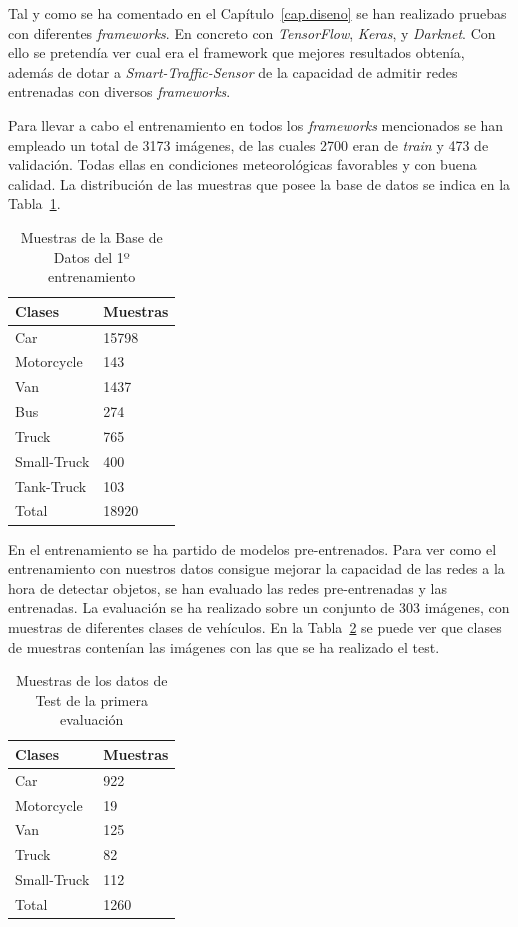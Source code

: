 Tal y como se ha comentado en el Capítulo~\ref{cap.diseno} se han realizado pruebas con diferentes \textit{frameworks}. En concreto con \textit{TensorFlow}, \textit{Keras}, y \textit{Darknet}. Con ello se pretendía ver cual era el framework que mejores resultados obtenía, además de dotar a \textit{Smart-Traffic-Sensor} de la capacidad de admitir redes entrenadas con diversos \textit{frameworks}.

Para llevar a cabo el entrenamiento en todos los \textit{frameworks} mencionados se han empleado un total de 3173 imágenes, de las cuales 2700 eran de \textit{train} y 473 de validación. Todas ellas en condiciones meteorológicas favorables y con buena calidad. La distribución de las muestras que posee la base de datos se indica en la Tabla~\ref{tabla_database}.

\begin{table}[H]
\begin{center}
\begin{tabular}{|l|l|}
\hline
Clases & Muestras \\
\hline \hline
Car & 15798 \\ \hline
Motorcycle & 143 \\ \hline
Van & 1437 \\ \hline
Bus & 274 \\ \hline
Truck & 765 \\ \hline
Small-Truck & 400 \\ \hline
Tank-Truck & 103 \\ \hline
Total & 18920 \\ \hline
\end{tabular}
\caption{Muestras de la Base de Datos del 1º entrenamiento}
\label{tabla_database}
\end{center}
\end{table}

En el entrenamiento se ha partido de modelos pre-entrenados. Para ver como el entrenamiento con nuestros datos consigue mejorar la capacidad de las redes a la hora de detectar objetos, se han evaluado las redes pre-entrenadas y las entrenadas. La evaluación se ha realizado sobre un conjunto de 303 imágenes, con muestras de diferentes clases de vehículos. En la Tabla~\ref{tabla_datos_primera_evaluacion} se puede ver que clases de muestras contenían las imágenes con las que se ha realizado el test.

\begin{table}[H]
\begin{center}
\begin{tabular}{|l|l|}
\hline
Clases & Muestras \\
\hline \hline
Car & 922 \\ \hline
Motorcycle & 19 \\ \hline
Van & 125 \\ \hline
Truck & 82 \\ \hline
Small-Truck & 112 \\ \hline
Total & 1260 \\ \hline
\end{tabular}
\caption{Muestras de los datos de Test de la primera evaluación}
\label{tabla_datos_primera_evaluacion}
\end{center}
\end{table}

